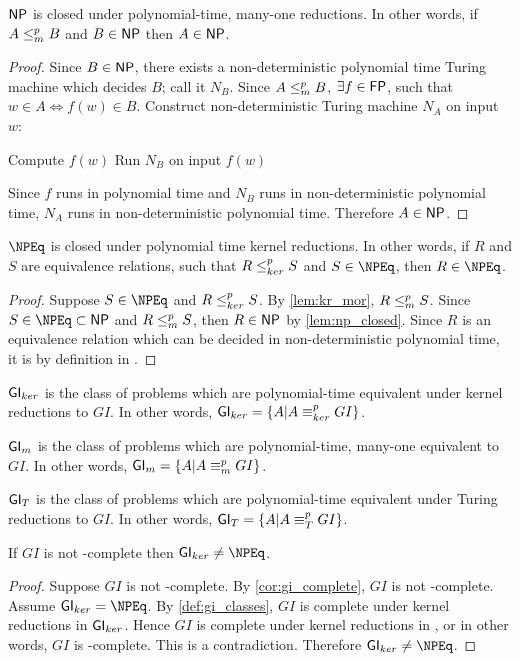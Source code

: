 \begin{lemma}\label{lem:np_closed}${\mathsf{NP}}$ is closed under polynomial-time,
  many-one reductions. In other words, if $A\leq^{p}_{m} B$ and $B\in{\ensuremath{\mathsf{NP}}}$ then
  $A\in{\ensuremath{\mathsf{NP}}}$.\end{lemma}
\begin{proof}
  Since $B\in{\ensuremath{\mathsf{NP}}}$, there exists a non-deterministic polynomial time Turing
  machine which decides $B$; call it $N_B$. Since $A\leq^{p}_{m} B$, $\exists f\in{\ensuremath{\mathsf{FP}}}$,
  such that $w\in A\iff f(w)\in B$. Construct non-deterministic Turing machine
  $N_A$ on input $w$:\\
  \begin{algorithm}[H]
    Compute $f(w)$\;
    Run $N_B$ on input $f(w)$\;
    \;
    \lElse{\REJECT}\;
  \end{algorithm}
  Since $f$ runs in polynomial time and $N_B$ runs in non-deterministic
  polynomial time, $N_A$ runs in non-deterministic polynomial time. Therefore
  $A\in{\ensuremath{\mathsf{NP}}}$.
\end{proof}

\begin{corollary}\label{cor:npeq_closed}$\NPEq$ is closed under polynomial time
  kernel reductions. In other words, if $R$ and $S$ are equivalence relations,
  such that $R\leq^{p}_{ker} S$ and $S\in\NPEq$, then $R\in\NPEq$.\end{corollary}
\begin{proof}Suppose $S\in\NPEq$ and $R\leq^{p}_{ker} S$. By \autoref{lem:kr_mor},
  $R\leq^{p}_{m} S$. Since $S\in\NPEq\subset\NP$ and $R\leq^{p}_{m} S$, then $R\in{\ensuremath{\mathsf{NP}}}$ by
  \autoref{lem:np_closed}. Since $R$ is an equivalence relation which can be
  decided in non-deterministic polynomial time, it is by definition in \NPEq.
\end{proof}

\begin{definition}\label{def:gi_classes}${\mathsf{GI}}_{ker}$ is the class of problems
  which are polynomial-time equivalent under kernel reductions to $GI$. In
  other words, ${\mathsf{GI}}_{ker}=\{A|A\equiv^{p}_{ker} GI\}$.

  ${\mathsf{GI}}_m$ is the class of problems which are polynomial-time, many-one
  equivalent to $GI$. In other words, ${\mathsf{GI}}_m=\{A|A\equiv^{p}_m GI\}$.

  ${\mathsf{GI}}_T$ is the class of problems which are polynomial-time equivalent under
  Turing reductions to $GI$. In other words, ${\mathsf{GI}}_T=\{A|A\equiv^{p}_T GI\}$.
\end{definition}

\begin{theorem}\label{thm:giker_neq_npeq}If $GI$ is not \NP-complete then
  $\GIker\neq\NPEq$.\end{theorem}
\begin{proof}
  Suppose $GI$ is not \NP-complete. By \autoref{cor:gi_complete}, $GI$ is not
  \NPEq-complete. Assume $\GIker=\NPEq$. By \autoref{def:gi_classes}, $GI$ is
  complete under kernel reductions in ${\mathsf{GI}}_{ker}$. Hence $GI$ is complete under
  kernel reductions in \NPEq, or in other words, $GI$ is \NPEq-complete. This
  is a contradiction. Therefore $\GIker\neq\NPEq$.
\end{proof}

